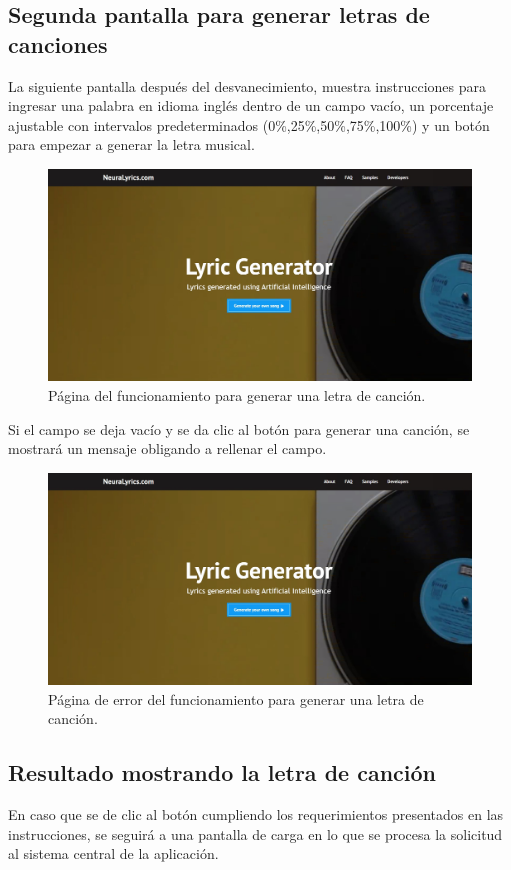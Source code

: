 \documentclass[12pt, a4paper, titlepage]{article}
\begin{document}
	\subsection{Segunda pantalla para generar letras de canciones}
	La siguiente pantalla después del desvanecimiento, muestra instrucciones para ingresar una palabra en idioma inglés dentro de un campo vacío, un porcentaje ajustable con intervalos predeterminados (0\%,25\%,50\%,75\%,100\%) y un botón para empezar a generar la letra musical.
	\begin{figure}[H] 
		\includegraphics[width=13.5cm]{./Imagenes/Capturas/pprincipal.jpg}
		\centering \caption{Página del funcionamiento para generar una letra de canción.}
	\end{figure}
	
	Si el campo se deja vacío y se da clic al botón para generar una canción, se mostrará un mensaje obligando a rellenar el campo.
	
	\begin{figure}[H] 
		\includegraphics[width=13.5cm]{./Imagenes/Capturas/pprincipal.jpg}
		\centering \caption{Página de error del funcionamiento para generar una letra de canción.}
	\end{figure}
	\subsection{Resultado mostrando la letra de canción}
	En caso que se de clic al botón cumpliendo los requerimientos presentados en las instrucciones, se seguirá a una pantalla de carga en lo que se procesa la solicitud al sistema central de la aplicación.
	
\end{document}
